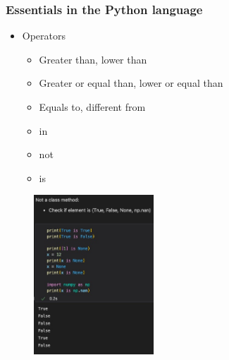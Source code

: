 \begin{frame}\frametitle{Essentials in the Python language}
   \begin{minipage}{0.48\linewidth}
      \begin{itemize}
         \item Operators
         \begin{itemize}
            \item Greater than, lower than
            \item Greater or equal than, lower or equal than
            \item Equals to, different from
            \item in
            \item not
            \item is
         \end{itemize}
      \end{itemize}
   \end{minipage}
   \begin{minipage}{0.48\linewidth}
      \begin{figure}[H]
         \includegraphics[width=4.5cm]{../images/illustrations/is.jpg}
      \end{figure}
   \end{minipage}
\end{frame}


